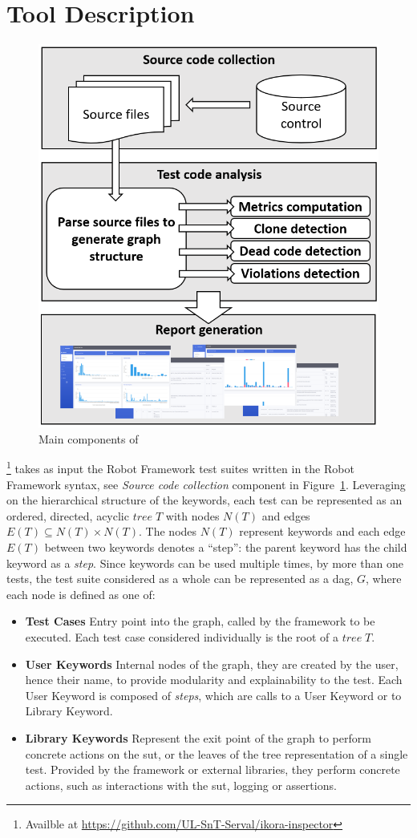 \section{Tool Description}

\begin{figure}[t!]
\centering
\includegraphics[width=0.5\columnwidth]{figures/ikora/structure.png}
\caption{Main components of \tool}
\label{fig:structure}
\end{figure}

\tool\;\footnote{Availble at \url{https://github.com/UL-SnT-Serval/ikora-inspector}} takes as input the Robot Framework test suites written in the Robot Framework syntax, see \emph{Source code collection} component in Figure~\ref{fig:structure}. Leveraging on the hierarchical structure of the keywords, each test can be represented as an ordered, directed, acyclic $tree\; T$ with nodes $N(T)$ and edges $E(T) \subseteq N(T) \times N(T)$. The nodes $N(T)$ represent keywords and each edge $E(T)$ between two keywords denotes a ``step'': the parent keyword has the child keyword as a \emph{step}. Since keywords can be used multiple times, by more than one tests, the test suite considered as a whole can be represented as a \gls{dag}, $G$, where each node is defined as one of:

 \begin{itemize}
     \item \textbf{Test Cases} Entry point into the graph, called by the framework to be executed. Each test case considered individually is the root of a $tree\; T$.
     \item \textbf{User Keywords} Internal nodes of the graph, they are created by the user, hence their name, to provide modularity and explainability to the test. Each User Keyword is composed of \emph{steps}, which are calls to a User Keyword or to Library Keyword.
     \item \textbf{Library Keywords} Represent the exit point of the graph to perform concrete actions on the \gls{sut}, or the leaves of the tree representation of a single test. Provided by the framework or external libraries, they perform concrete actions, such as interactions with the \gls{sut}, logging or assertions.
 \end{itemize}

